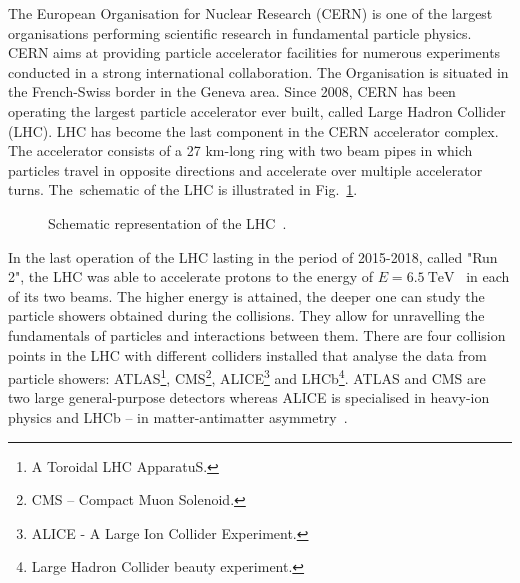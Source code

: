 
The European Organisation for Nuclear Research (CERN) is one of the largest organisations performing scientific research in fundamental particle physics. CERN aims at providing particle accelerator facilities for numerous experiments conducted in a strong international collaboration. The Organisation is situated in the French-Swiss border in the Geneva area. Since 2008, CERN has been operating the largest particle accelerator ever built, called Large Hadron Collider (LHC). LHC has become the last component in the CERN accelerator complex. The  accelerator consists of a 27 km-long ring with two beam pipes in which particles travel in opposite directions and accelerate over multiple accelerator turns. The~schematic of the LHC is illustrated in Fig.~\ref{fig:schematic_representation_lhc}.

\begin{figure}[H]
    \centering
    \caption{Schematic representation of the LHC~\cite{schematic_representation_lhc}.}
    \label{fig:schematic_representation_lhc}
\end{figure}

In the last operation of the LHC lasting in the period of 2015-2018, called "Run 2", the LHC was able to accelerate protons to the energy of $E=6.5~\text{TeV}$~\cite{cern_main_webpage} in each of its two beams. The higher energy is attained, the deeper one can study the particle showers obtained during the collisions. They allow for unravelling the fundamentals of particles and interactions between them. There are four collision points in the LHC with different colliders installed that analyse the data from particle showers: ATLAS\footnote{A Toroidal LHC ApparatuS.}, CMS\footnote{CMS -- Compact Muon Solenoid.}, ALICE\footnote{ALICE - A Large Ion Collider Experiment.} and LHCb\footnote{Large Hadron Collider beauty experiment.}. ATLAS and CMS are two large general-purpose detectors whereas ALICE is specialised in heavy-ion physics and LHCb -- in matter-antimatter asymmetry~\cite[p.~3-21]{evans_marvel_of_technology}.

